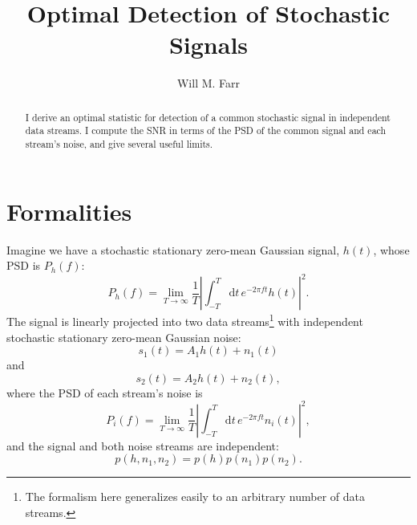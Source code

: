 \documentclass[modern]{aastex63}
\newcommand{\dd}{\mathrm{d}}
\begin{document}
\title{Optimal Detection of Stochastic Signals}
\author[0000-0003-1540-8562]{Will M. Farr}

\begin{abstract}
%
  I derive an optimal statistic for detection of a common stochastic signal in
  independent data streams.  I compute the SNR in terms of the \ac{PSD} of the
  common signal and each stream's noise, and give several useful limits.
%
\end{abstract}

\section{Formalities}

Imagine we have a stochastic stationary zero-mean Gaussian signal, $h(t)$, whose
\ac{PSD} is $P_h(f)$:
%
\begin{equation}
P_h(f) = \lim_{T \to \infty} \frac{1}{T} \left| \int_{-T}^{T} \dd t \, e^{-2\pi f t} h(t) \right|^2.
\end{equation}
%
The signal is linearly projected into two data streams\footnote{The formalism
here generalizes easily to an arbitrary number of data streams.} with
independent stochastic stationary zero-mean Gaussian noise:
%
\begin{equation}
  s_1(t) = A_1 h(t) + n_1(t)
\end{equation}
%
and
%
\begin{equation}
  s_2(t) = A_2 h(t) + n_2(t),
\end{equation}
%
where the \ac{PSD} of each stream's noise is
%
\begin{equation}
  P_i(f) = \lim_{T \to \infty} \frac{1}{T} \left| \int_{-T}^{T} \dd t \, e^{-2\pi f t} n_i(t) \right|^2,
\end{equation}
%
and the signal and both noise streams are independent:
%
\begin{equation}
  p\left( h, n_1, n_2 \right) = p\left( h \right) p\left( n_1 \right) p\left( n_2 \right).
\end{equation}
\end{document}

